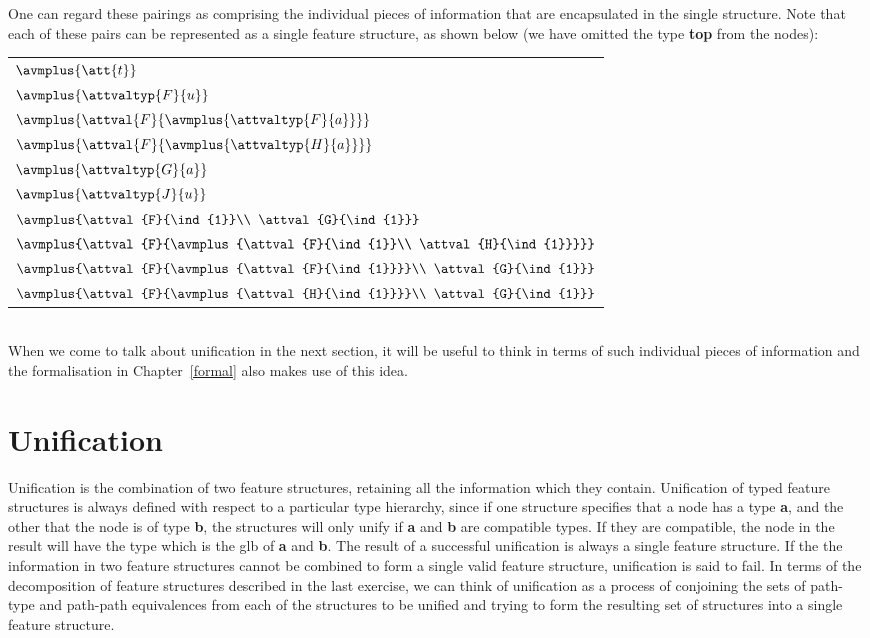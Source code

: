 \documentclass[12pt]{report}
\begin{document}
\begin{enumerate}
One can regard these pairings as comprising the individual 
pieces of information that are encapsulated in the single structure.
Note that each of these pairs can be represented as a single
feature structure, as shown below (we have omitted the type {\bf *top}
from the nodes):\\
\begin{tabular}{l}
{\tiny $\avmplus{\att{t}}$}\\
{\tiny $\avmplus{\attvaltyp{F}{u}}$}\\
{\tiny $\avmplus{\attval{F}{\avmplus{\attvaltyp{F}{a}}}}$}\\
{\tiny $\avmplus{\attval{F}{\avmplus{\attvaltyp{H}{a}}}}$}\\
{\tiny $\avmplus{\attvaltyp{G}{a}}$}\\
{\tiny $\avmplus{\attvaltyp{J}{u}}$}\\
{\tiny $\avmplus{\attval{F}{\ind{1}}\\
\attval{G}{\ind{1}}}$}\\
{\tiny $\avmplus{\attval{F}{\avmplus{\attval{F}{\ind{1}}\\
\attval{H}{\ind{1}}}}}$}\\
{\tiny $\avmplus{\attval{F}{\avmplus{\attval{F}{\ind{1}}}}\\
\attval{G}{\ind{1}}}$}\\
{\tiny $\avmplus{\attval{F}{\avmplus{\attval{H}{\ind{1}}}}\\
\attval{G}{\ind{1}}}$}
\end{tabular}\\
When we come to talk about unification in the next section,
it will be useful to think in terms of such individual
pieces of information and the formalisation in Chapter~\ref{formal}
also makes use of this idea.
\end{enumerate}


\section{Unification}

Unification is the combination of two feature
structures, retaining all the information which they contain.
Unification of typed feature structures is always 
defined with respect to a particular type hierarchy,
since if one structure specifies that a node
has a type {\bf a}, and the other that the node is of
type {\bf b}, the structures will only unify
if {\bf a} and {\bf b} are compatible types.
If they are compatible, the node in the result will have 
the type which is the glb of {\bf a}
and {\bf b}.
The result of a successful unification is always
a single feature structure.
If the the information in
two feature structures cannot be combined to form a single
valid feature structure,
unification is said to fail.  In terms of the
decomposition of feature structures described in the last
exercise, we can think of unification as a process
of conjoining the sets of path-type and path-path 
equivalences from each of the structures to be unified
and trying to form the resulting set of structures
into a single feature structure. 
\end{document}
